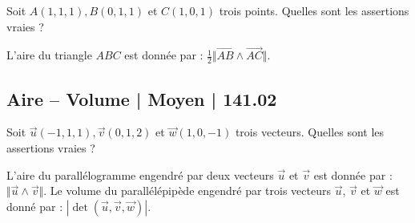 \begin{question}
 
Soit $A(1,1,1), B(0,1,1)$ et $C(1,0,1)$ trois points. Quelles sont les assertions vraies ?
\begin{answers}



\end{answers}
\begin{explanations}
L'aire du triangle $ABC$ est donnée par : $\frac{1}{2} \Vert \overrightarrow{AB} \wedge \overrightarrow{AC} \Vert$. 
\end{explanations}

\end{question}




\subsection{Aire -- Volume | Moyen | 141.02}
 
 
\begin{question} 

Soit $\vec{u}(-1,1,1), \vec{v}(0,1,2)$ et $\vec{w}(1,0,-1)$ trois vecteurs. Quelles sont les assertions vraies ?
\begin{answers}

      
      


\end{answers}
\begin{explanations}
L'aire du parallélogramme engendré par deux vecteurs $\vec{u}$ et $\vec{v}$ est donnée par : $ \Vert \vec{u} \wedge \vec{v} \Vert$.
Le volume du parallélépipède engendré par trois vecteurs $\vec{u}$, $\vec{v}$ et  $\vec{w}$ est donné par : $|\det (\vec{u}, \vec{v},\vec{w})|$.
\end{explanations}

\end{question}


